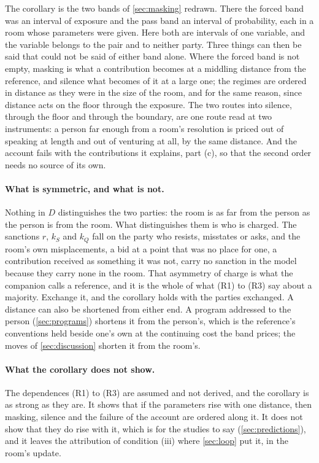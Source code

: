 The corollary is the two bands of \autoref{sec:masking} redrawn. There the forced band was an interval of exposure and the pass band an interval of probability, each in a room whose parameters were given. Here both are intervals of one variable, and the variable belongs to the pair and to neither party. Three things can then be said that could not be said of either band alone. Where the forced band is not empty, masking is what a contribution becomes at a middling distance from the reference, and silence what becomes of it at a large one; the regimes are ordered in distance as they were in the size of the room, and for the same reason, since distance acts on the floor through the exposure. The two routes into silence, through the floor and through the boundary, are one route read at two instruments: a person far enough from a room's resolution is priced out of speaking at length and out of venturing at all, by the same distance. And the account fails with the contributions it explains, part (c), so that the second order needs no source of its own.

\paragraph{What is symmetric, and what is not.} Nothing in $D$ distinguishes the two parties: the room is as far from the person as the person is from the room. What distinguishes them is who is charged. The sanctions $r$, $k_S$ and $k_Q$ fall on the party who resists, misstates or asks, and the room's own misplacements, a bid at a point that was no place for one, a contribution received as something it was not, carry no sanction in the model because they carry none in the room. That asymmetry of charge is what the companion calls a reference, and it is the whole of what (R1) to (R3) say about a majority. Exchange it, and the corollary holds with the parties exchanged. A distance can also be shortened from either end. A program addressed to the person (\autoref{sec:programs}) shortens it from the person's, which is the reference's conventions held beside one's own at the continuing cost the band prices; the moves of \autoref{sec:discussion} shorten it from the room's.

\paragraph{What the corollary does not show.} The dependences (R1) to (R3) are assumed and not derived, and the corollary is as strong as they are. It shows that if the parameters rise with one distance, then masking, silence and the failure of the account are ordered along it. It does not show that they do rise with it, which is for the studies to say (\autoref{sec:predictions}), and it leaves the attribution of condition (iii) where \autoref{sec:loop} put it, in the room's update.

